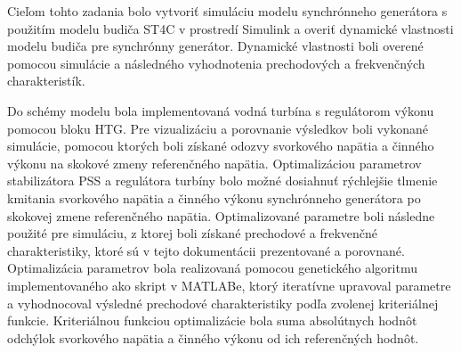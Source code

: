 Cieľom tohto zadania bolo vytvoriť simuláciu modelu synchrónneho generátora s použitím modelu budiča ST4C v prostredí Simulink a overiť dynamické vlastnosti modelu budiča pre synchrónny generátor. Dynamické vlastnosti boli overené pomocou simulácie a následného vyhodnotenia prechodových a frekvenčných charakteristík. 

Do schémy modelu bola implementovaná vodná turbína s regulátorom výkonu pomocou bloku HTG. Pre vizualizáciu a porovnanie výsledkov boli vykonané simulácie, pomocou ktorých boli získané odozvy svorkového napätia a činného výkonu na skokové zmeny referenčného napätia. Optimalizáciou parametrov stabilizátora PSS a regulátora turbíny bolo možné dosiahnuť rýchlejšie tlmenie kmitania svorkového napätia a činného výkonu synchrónneho generátora po skokovej zmene referenčného napätia. Optimalizované parametre boli následne použité pre simuláciu, z ktorej boli získané prechodové a frekvenčné charakteristiky, ktoré sú v tejto dokumentácii prezentované a porovnané. Optimalizácia parametrov bola realizovaná pomocou genetického algoritmu implementovaného ako skript v MATLABe, ktorý iteratívne upravoval parametre a vyhodnocoval výsledné prechodové charakteristiky podľa zvolenej kriteriálnej funkcie. Kriteriálnou funkciou optimalizácie bola suma absolútnych hodnôt odchýlok svorkového napätia a činného výkonu od ich referenčných hodnôt.